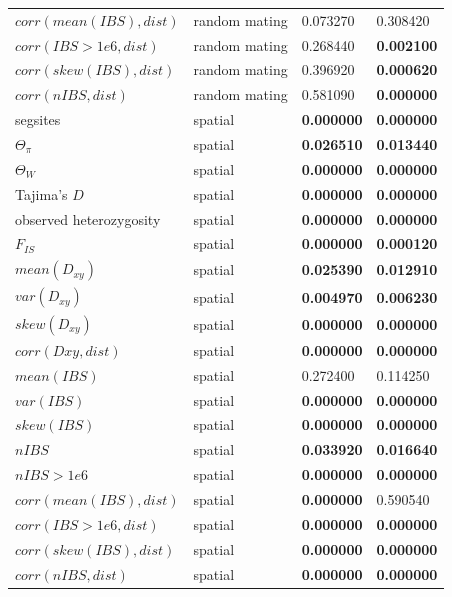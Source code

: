 \documentclass[10pt,twoside,lineno,hidelinks]{preprint}
\begin{document}
\begin{table}[htbp]
\begin{tableminipage}{\textwidth}
\begin{tabularx}{\textwidth}{XXXX}
$corr(mean(IBS),dist)$ & random mating & 0.073270 & 0.308420 \\ 
$corr(IBS>1e6,dist)$ & random mating & 0.268440 & \textbf{0.002100} \\ 
$corr(skew(IBS),dist)$ & random mating & 0.396920 & \textbf{0.000620} \\ 
$corr(nIBS,dist)$ & random mating & 0.581090 & \textbf{0.000000} \\ 
segsites & spatial & \textbf{0.000000} & \textbf{0.000000} \\ 
$\Theta_{\pi}$ & spatial & \textbf{0.026510} & \textbf{0.013440} \\ 
$\Theta_{W}$ & spatial & \textbf{0.000000} & \textbf{0.000000} \\ 
Tajima's $D$ & spatial & \textbf{0.000000} & \textbf{0.000000} \\ 
observed heterozygosity & spatial & \textbf{0.000000} & \textbf{0.000000} \\ 
$F_{IS}$ & spatial & \textbf{0.000000} & \textbf{0.000120} \\ 
$mean(D_{xy})$ & spatial & \textbf{0.025390} & \textbf{0.012910} \\ 
$var(D_{xy})$ & spatial & \textbf{0.004970} & \textbf{0.006230} \\ 
$skew(D_{xy})$ & spatial & \textbf{0.000000} & \textbf{0.000000} \\ 
$corr(Dxy,dist)$ & spatial & \textbf{0.000000} & \textbf{0.000000} \\ 
$mean(IBS)$ & spatial & 0.272400 & 0.114250 \\ 
$var(IBS)$ & spatial & \textbf{0.000000} & \textbf{0.000000} \\ 
$skew(IBS)$ & spatial & \textbf{0.000000} & \textbf{0.000000} \\ 
$nIBS$ & spatial & \textbf{0.033920} & \textbf{0.016640} \\ 
$nIBS>1e6$ & spatial & \textbf{0.000000} & \textbf{0.000000} \\ 
$corr(mean(IBS),dist)$ & spatial & \textbf{0.000000} & 0.590540 \\ 
$corr(IBS>1e6,dist)$ & spatial & \textbf{0.000000} & \textbf{0.000000} \\ 
$corr(skew(IBS),dist)$ & spatial & \textbf{0.000000} & \textbf{0.000000} \\ 
$corr(nIBS,dist)$ & spatial & \textbf{0.000000} & \textbf{0.000000} \\ 
\hline
\end{tabularx}
\end{tableminipage}
\label{table:sampling}
\end{table}
\FloatBarrier
\end{document}
